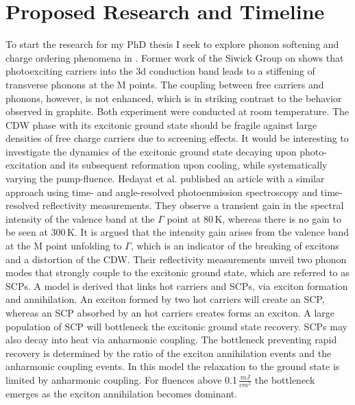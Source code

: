\section{Proposed Research and Timeline}
To start the research for my PhD thesis I seek to explore phonon softening and charge ordering phenomena in \ts.
Former work of the Siwick Group on \ts\space shows that photoexciting carriers into the 3d conduction band leads to a stiffening of transverse phonons at the M points\cite{otto2021}.
The coupling between free carriers and phonons, however, is not enhanced, which is in striking contrast to the behavior observed in graphite\cite{stern2018}.
Both experiment were conducted at room temperature.
The \ac{CDW} phase with its excitonic ground state should be fragile against large densities of free charge carriers due to screening effects.
It would be interesting to investigate the dynamics of the excitonic ground state decaying upon photo-excitation and its subsequent reformation upon cooling, while systematically varying the pump-fluence.
Hedayat et al. published an article with a similar approach using time- and angle-resolved photoenmission spectroscopy and time-resolved reflectivity measurements\cite{hedayat2019}.
They observe a transient gain in the spectral intensity of the valence band at the $\Gamma$ point at 80\,K, whereas there is no gain to be seen at 300\,K.
It is argued that the intensity gain arises from the valence band at the M point unfolding to $\Gamma$, which is an indicator of the breaking of excitons and a distortion of the \ac{CDW}.
Their reflectivity measurements unveil two phonon modes that strongly couple to the excitonic ground state, which are referred to as \acp{SCP}.
A model is derived that links hot carriers and \acp{SCP}, via exciton formation and annihilation.
An exciton formed by two hot carriers will create an \ac{SCP}, whereas an \ac{SCP} absorbed by an hot carriers creates forms an exciton.
A large population of \ac{SCP} will bottleneck the excitonic ground state recovery.
\Acp{SCP} may also decay into heat via anharmonic coupling.
The bottleneck preventing rapid recovery is determined by the ratio of the exciton annihilation events and the anharmonic coupling events.
In this model the relaxation to the ground state is limited by anharmonic coupling.
For fluences above 0.1\,$\frac{mJ}{cm^2}$ the bottleneck emerges as the exciton annihilation becomes dominant.

